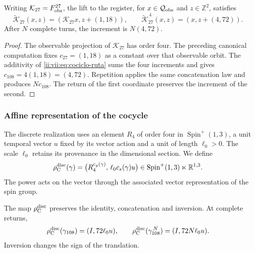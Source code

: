 \begin{proposition}
\label{ii:vii:prop:memoria-vuelta-completa}
Writing \(\mathcal K_{27}=F_{\rm obs}^{27}\), the lift
to the register, for \(x\in\mathcal Q_{\rm obs}\) and \(z\in\mathbb Z^2\), satisfies
\[
 \widetilde{\mathcal K}_{27}(x,z)
   =(\mathcal K_{27}x,z+(1,18)),\qquad
 \widetilde{\mathcal K}_{27}^{\,4}(x,z)
   =(x,z+(4,72)).
\]
After \(N\) complete turns, the increment is \(N(4,72)\).
\end{proposition}

\begin{proof}
The observable projection of \(\mathcal K_{27}\) has order four.
The preceding canonical computation fixes \(c_{27}=(1,18)\) as a constant
over that observable orbit. The additivity of
\eqref{ii:vii:eq:cociclo-ruta} sums the four increments and gives
\(c_{108}=4(1,18)=(4,72)\).
Repetition applies the same concatenation law and produces
\(Nc_{108}\). The return of the first coordinate preserves the
increment of the second.
\end{proof}

\subsubsection{Affine representation of the cocycle}
\label{ii:vii:subsec:representacion-afin-cociclo}

The discrete realization uses an element \(R_4\) of order four in
\(\operatorname{Spin}^+(1,3)\), a unit temporal vector \(u\)
fixed by its vector action and a unit of length \(\ell_0>0\).
The scale \(\ell_0\) retains its provenance in the dimensional section.
We define
\begin{equation}
 \rho_{\rm C}^{\rm disc}(\gamma)=
 \bigl(R_4^{c_g(\gamma)},\,\ell_0c_s(\gamma)u\bigr)
 \in\operatorname{Spin}^+(1,3)\ltimes\mathbb R^{1,3}.
 \label{ii:vii:eq:representacion-discreta-memoria}
\end{equation}
The power acts on the vector through the associated vector
representation of the spin group.

\begin{theorem}
\label{ii:vii:thm:traslacion-memoria}
The map \(\rho_{\rm C}^{\rm disc}\) preserves the identity,
concatenation and inversion. At complete returns,
\begin{equation}
 \rho_{\rm C}^{\rm disc}(\gamma_{108})=(I,72\ell_0u),\qquad
 \rho_{\rm C}^{\rm disc}(\gamma_{108}^{\,N})=(I,72N\ell_0u).
 \label{ii:vii:eq:traslacion-retorno-108}
\end{equation}
Inversion changes the sign of the translation.
\end{theorem}


